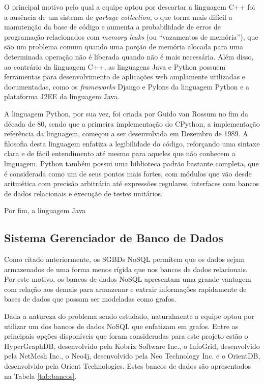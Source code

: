 O principal motivo pelo qual a equipe optou por descartar a linguagem C++ foi a ausência de um sistema de \emph{garbage collection}, o que torna mais difícil a manutenção da base de código e aumenta a probabilidade de erros de programação relacionados com \emph{memory leaks} (ou ``vazamentos de memória''), que são um problema comum quando uma porção de memória alocada para uma determinada operação não é liberada quando não é mais necessária.
Além disso, ao contrário da linguagem C++, as linguagens Java e Python possuem ferramentas para desenvolvimento de aplicações web amplamente utilizadas e documentadas, como os \emph{frameworks} Django e Pylons da linguagem Python e a plataforma J2EE da linguagem Java.

A linguagem Python, por sua vez, foi criada por Guido van Rossum no fim da década de 80, sendo que a primeira implementação do CPython, a implementação referência da linguagem, começou a ser desenvolvida em Dezembro de 1989.
A filosofia desta linguagem enfatiza a legibilidade do código, reforçando uma sintaxe clara e de fácil entendimento até mesmo para aqueles que não conhecem a linguagem.
Python também possui uma biblioteca padrão bastante completa, que é considerada como um de seus pontos mais fortes, com módulos que vão desde aritmética com precisão arbitrária até expressões regulares, interfaces com bancos de dados relacionais e execução de testes unitários.

Por fim, a linguagem Java



\subsection{Sistema Gerenciador de Banco de Dados}

Como citado anteriormente, os SGBDs NoSQL permitem que os dados sejam armazenados de uma forma menos rígida que nos bancos de dados relacionais.
Por este motivo, os bancos de dados NoSQL apresentam uma grande vantagem com relação aos demais para armazenar e extrair informações rapidamente de bases de dados que possam ser modeladas como grafos. %

Dada a natureza do problema sendo estudado, naturalmente a equipe optou por utilizar um dos bancos de dados NoSQL que enfatizam em grafos.
Entre as principais opções disponíveis que foram consideradas para este projeto estão o HyperGraphDB, desenvolvido pela Kobrix Software Inc., o InfoGrid, desenvolvido pela NetMesh Inc., o Neo4j, desenvolvido pela Neo Technology Inc. e o OrientDB, desenvolvido pela Orient Technologies.
Estes bancos de dados são apresentados na Tabela \ref{tab:bancos}.

